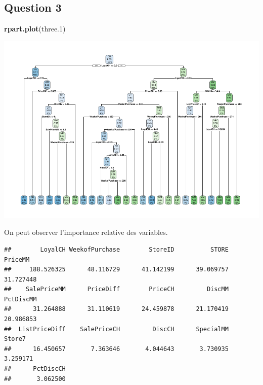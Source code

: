 \documentclass[]{article}
\newenvironment{Shaded}{\begin{snugshade}}{\end{snugshade}}
\newcommand{\FloatTok}[1]{\textcolor[rgb]{0.00,0.00,0.81}{#1}}
\newcommand{\KeywordTok}[1]{\textcolor[rgb]{0.13,0.29,0.53}{\textbf{#1}}}
\newcommand{\NormalTok}[1]{#1}
\newcommand{\OperatorTok}[1]{\textcolor[rgb]{0.81,0.36,0.00}{\textbf{#1}}}
\begin{document}
\hypertarget{question-3}{%
\subsection{Question 3}\label{question-3}}

\begin{Shaded}
\begin{Highlighting}[]
\KeywordTok{rpart.plot}\NormalTok{(three}\FloatTok{.1}\NormalTok{)}
\end{Highlighting}
\end{Shaded}

\includegraphics{durand_eltarr_files/figure-latex/unnamed-chunk-14-1.pdf}

On peut observer l'importance relative des variables.

\begin{Shaded}
\end{Shaded}

\begin{verbatim}
##        LoyalCH WeekofPurchase        StoreID          STORE        PriceMM 
##     188.526325      48.116729      41.142199      39.069757      31.727448 
##    SalePriceMM      PriceDiff        PriceCH         DiscMM      PctDiscMM 
##      31.264888      31.110619      24.459878      21.170419      20.986853 
##  ListPriceDiff    SalePriceCH         DiscCH      SpecialMM         Store7 
##      16.450657       7.363646       4.044643       3.730935       3.259171 
##      PctDiscCH 
##       3.062500
\end{verbatim}
\end{document}
